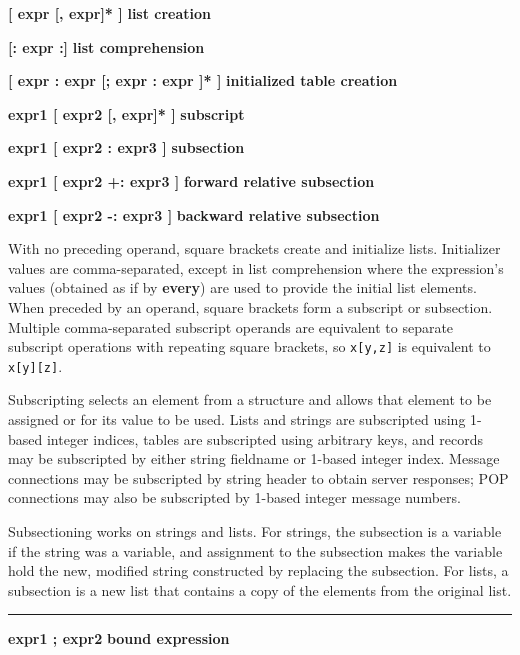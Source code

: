\noindent
{\bf \textbf{[} expr [, expr]* \textbf{]} } \hfill {\bf list creation}

\noindent
{\bf \textbf{[:} expr \textbf{:]} } \hfill {\bf list comprehension}

\noindent
{\bf \textbf{[} expr : expr [; expr : expr ]* \textbf{]} } \hfill {\bf
initialized table creation}

\noindent
{\bf expr1 \textbf{[} expr2 [, expr]* \textbf{]} } \hfill {\bf subscript}

\noindent
{\bf expr1 \textbf{[} expr2 : expr3 \textbf{]} } \hfill {\bf subsection}\WarningNotThreadSafe
{}

\noindent
{\bf expr1 \textbf{[} expr2 +: expr3 \textbf{]} } \hfill {\bf forward relative subsection}

\noindent
{\bf expr1 \textbf{[} expr2 -: expr3 \textbf{]} } \hfill {\bf backward relative subsection}

\noindent
With no preceding operand, square brackets create and initialize lists.
Initializer values are comma-separated, except in list comprehension
where the expression's values (obtained as if by \textbf{every}) are used
to provide the initial list elements.
When preceded by an operand, square brackets form a subscript or
subsection. Multiple comma-separated subscript operands are equivalent
to separate subscript operations with repeating square brackets, so
\texttt{x[y,z]} is equivalent to \texttt{x[y][z]}.

Subscripting selects an element from a structure and allows that element
to be assigned or for its value to be used. Lists and strings are
subscripted using 1-based integer indices, tables are subscripted using
arbitrary keys, and records may be subscripted by either string
fieldname or 1-based integer index. Message connections may be
subscripted by string header to obtain server responses; POP
connections may also be subscripted by 1-based integer message numbers.

Subsectioning works on strings and lists. For strings, the subsection is
a variable if the string was a variable, and
assignment to the subsection makes the
variable hold the new, modified string constructed by replacing the subsection.
For lists, a subsection is a new
list that contains a copy of the elements from the original list.

\bigskip\hrule\vspace{0.1cm}
\noindent
{\bf expr1 ; expr2 } \hfill {\bf bound expression}

